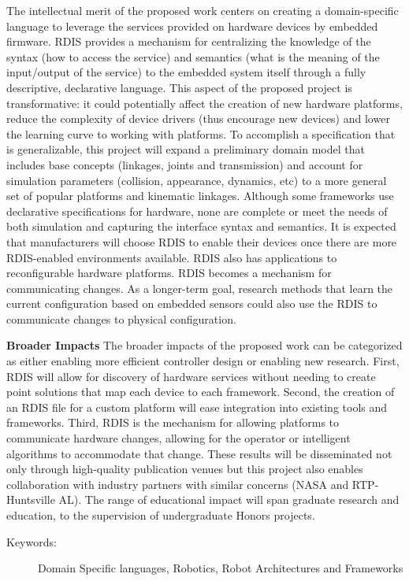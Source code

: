 The intellectual merit of the proposed work centers on creating a domain-specific language to leverage the services provided on hardware devices by embedded firmware.  RDIS  provides a mechanism for centralizing the knowledge of the syntax (how to access the service) and semantics (what is the meaning of the input/output of the service) to the embedded system itself through a fully descriptive, declarative language.  This aspect of the proposed project is transformative: it could potentially affect the creation of new hardware platforms, reduce the complexity of device drivers (thus encourage new devices) and lower the learning curve to working with platforms.   To accomplish a specification that is generalizable, this project will expand a preliminary domain model that includes base concepts (linkages, joints and transmission) and account for simulation parameters (collision, appearance, dynamics, etc) to a more general set of popular platforms and kinematic linkages.  Although some frameworks use declarative specifications for hardware, none are complete or meet the needs of both simulation and capturing the interface syntax and semantics. It is expected that manufacturers will choose RDIS to enable their devices once there are more RDIS-enabled environments available.  RDIS also has applications to reconfigurable hardware platforms. RDIS becomes a mechanism for communicating changes.  As a longer-term goal, research methods that learn the current configuration based on embedded sensors could also use the RDIS to communicate changes to physical configuration.

\textbf{Broader Impacts}
The broader impacts of the proposed work can be categorized as either enabling more efficient controller design or enabling new research.   First, RDIS will allow for discovery of hardware services without needing to create point solutions that map each device to each framework.  Second, the creation of an RDIS file for a custom platform will ease integration into existing tools and frameworks.  Third, RDIS is the mechanism for allowing platforms to communicate hardware changes, allowing for the operator or intelligent algorithms to accommodate that change.  These results will be disseminated not only through high-quality publication venues but this project also enables collaboration with industry partners with similar concerns (NASA and RTP-Huntsville AL).
The range of educational impact will span graduate research and education, to the supervision of undergraduate Honors projects.

\begin{description}
	\item[Keywords:]
   Domain Specific languages, Robotics, Robot Architectures and Frameworks
\end{description}
